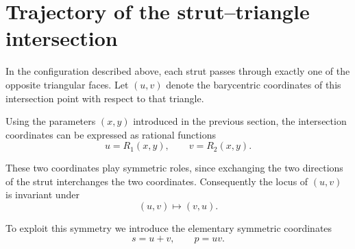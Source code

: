 \documentclass[12pt]{article}
\begin{document}
%
%
%
%


\section{Trajectory of the strut--triangle intersection}
\label{sec:intersection}

In the configuration described above, each strut passes through
exactly one of the opposite triangular faces.
Let $(u,v)$ denote the barycentric coordinates of this intersection
point with respect to that triangle.

Using the parameters $(x,y)$ introduced in the previous section,
the intersection coordinates can be expressed as rational functions
\[
u = R_1(x,y), \qquad v = R_2(x,y).
\]

These two coordinates play symmetric roles,
since exchanging the two directions of the strut
interchanges the two coordinates.
Consequently the locus of $(u,v)$ is invariant under
\[
(u,v) \longmapsto (v,u).
\]

To exploit this symmetry we introduce the elementary symmetric
coordinates
\[
s = u+v, \qquad p = uv .
\]
\end{document}
